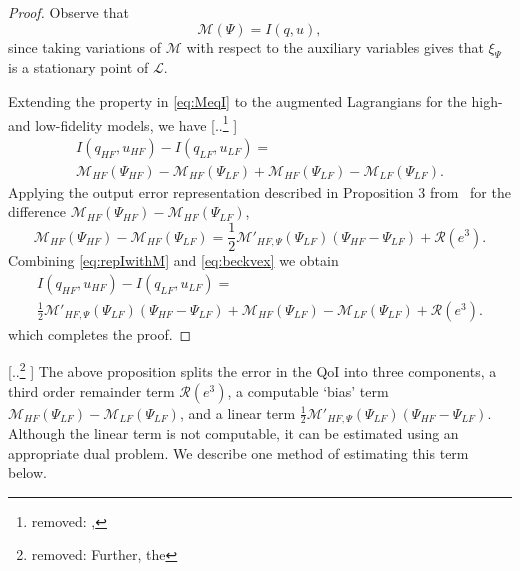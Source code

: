 \documentclass[review]{siamart0516}
\providecommand{\DIFaddtex}[1]{{\protect\color{blue} \sf #1}} %
\providecommand{\DIFdeltex}[1]{{\protect\color{red} [..\footnote{removed: #1} ]}} %
\providecommand{\DIFaddbegin}{} %
\providecommand{\DIFaddend}{} %
\providecommand{\DIFdelbegin}{} %
\providecommand{\DIFdelend}{} %
\providecommand{\DIFadd}[1]{\texorpdfstring{\DIFaddtex{#1}}{#1}} %
\providecommand{\DIFdel}[1]{\texorpdfstring{\DIFdeltex{#1}}{}} %
\newcommand{\DIFscaledelfig}{0.5}
\newlength{\DIFdelgraphicswidth} %
\newlength{\DIFdelgraphicsheight} %
\newcommand{\DIFaddincludegraphics}[2][]{{\color{blue}\fbox{\DIFOincludegraphics[#1]{#2}}}} %
\newcommand{\DIFdelincludegraphics}[2][]{%
\sbox{\DIFdelgraphicsbox}{\DIFOincludegraphics[#1]{#2}}%
\settoboxwidth{\DIFdelgraphicswidth}{\DIFdelgraphicsbox} %
\settoboxtotalheight{\DIFdelgraphicsheight}{\DIFdelgraphicsbox} %
\scalebox{\DIFscaledelfig}{%
\parbox[b]{\DIFdelgraphicswidth}{\usebox{\DIFdelgraphicsbox}\\[-\baselineskip] \rule{\DIFdelgraphicswidth}{0em}}\llap{\resizebox{\DIFdelgraphicswidth}{\DIFdelgraphicsheight}{%
\setlength{\unitlength}{\DIFdelgraphicswidth}%
\begin{picture}(1,1)%
\thicklines\linethickness{2pt} %
{\color[rgb]{1,0,0}\put(0,0){\framebox(1,1){}}}%
{\color[rgb]{1,0,0}\put(0,0){\line( 1,1){1}}}%
{\color[rgb]{1,0,0}\put(0,1){\line(1,-1){1}}}%
\end{picture}%
}\hspace*{3pt}}} %
} %
\DeclareRobustCommand{\DIFaddbegin}{\DIFOaddbegin \let\includegraphics\DIFaddincludegraphics} %
\DeclareRobustCommand{\DIFaddend}{\DIFOaddend \let\includegraphics\DIFOincludegraphics} %
\DeclareRobustCommand{\DIFdelbegin}{\DIFOdelbegin \let\includegraphics\DIFdelincludegraphics} %
\DeclareRobustCommand{\DIFdelend}{\DIFOaddend \let\includegraphics\DIFOincludegraphics} %
\begin{document}
\DIFaddend %
\begin{proof}
%
Observe that
%
\begin{equation}
\label{eq:MeqI}
\mathcal{M}(\Psi)=I(q,u),
\end{equation}
%
since taking variations of $\mathcal{M}$ with respect to the auxiliary variables gives that $\xi_\Psi$ is a stationary point of $\mathcal{L}$.

Extending the property in \cref{eq:MeqI} to the augmented Lagrangians for the high- and low-fidelity models, we have
\DIFdelbegin \DIFdel{,
}\DIFdelend %
\begin{multline}
\label{eq:repIwithM}
I(q_{HF},u_{HF})-I(q_{LF},u_{LF})=\\\mathcal{M}_{HF}(\Psi_{HF})-\mathcal{M}_{HF}(\Psi_{LF})+\mathcal{M}_{HF}(\Psi_{LF})-\mathcal{M}_{LF}(\Psi_{LF})\textrm{.}
\end{multline}
%
Applying \DIFaddbegin \DIFadd{the output error representation described in }\DIFaddend Proposition 3 from~\cite{BecVex05} %
for the difference $\mathcal{M}_{HF}(\Psi_{HF})-\mathcal{M}_{HF}(\Psi_{LF})$,
\begin{equation}
\label{eq:beckvex}
\mathcal{M}_{HF}(\Psi_{HF})-\mathcal{M}_{HF}(\Psi_{LF}) = \frac{1}{2}\mathcal{M}'_{HF,\Psi}(\Psi_{LF})(\Psi_{HF}-\Psi_{LF})+\mathcal{R}(e^3)\textrm{.}
\end{equation}
Combining \cref{eq:repIwithM} and \cref{eq:beckvex} we obtain
\begin{multline}
\label{eq:preadj}
I(q_{HF},u_{HF})-I(q_{LF},u_{LF})=\\\frac{1}{2}\mathcal{M}'_{HF,\Psi}(\Psi_{LF})(\Psi_{HF}-\Psi_{LF})+\mathcal{M}_{HF}(\Psi_{LF})-\mathcal{M}_{LF}(\Psi_{LF})+\mathcal{R}(e^3)\textrm{.}
\end{multline}
\DIFaddbegin \DIFadd{which completes the proof.
}\end{proof}
\DIFaddend 

\DIFdelbegin \DIFdel{Further, the }\DIFdelend \DIFaddbegin \DIFadd{The above proposition splits the error in the QoI into three components, a third order remainder term $\mathcal{R}(e^3)$, a computable `bias' term $\mathcal{M}_{HF}(\Psi_{LF})-\mathcal{M}_{LF}(\Psi_{LF})$, and a linear term $\frac{1}{2}\mathcal{M}'_{HF,\Psi}(\Psi_{LF})(\Psi_{HF}-\Psi_{LF})$. Although the linear term is not computable, it can be estimated using an appropriate dual problem. We describe one method of estimating this term below.
}
\end{document}
